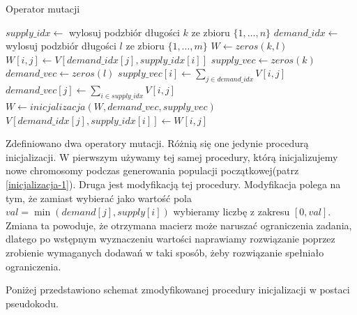 \begin{pseudokod}[H]
    \label{mutacja}
    \caption{Operator mutacji}
    \BlankLine
    $supply\_idx \gets$ wylosuj podzbiór długości $k$ ze zbioru $\{1, \dots, n\}$\;
    $demand\_idx \gets$ wylosuj podzbiór długości $l$ ze zbioru $\{1, \dots, m\}$\;
    $W \gets zeros(k, l)$
    \BlankLine
     {
         {
            $W[i, j] \gets V[demand\_idx[j], supply\_idx[i]]$\;
        }
    }
    \BlankLine
    $supply\_vec \gets zeros(k)$
    $demand\_vec \gets zeros(l)$
    \BlankLine
     {
        $supply\_vec[i] \gets \sum_{j \in demand\_idx} V[i, j]$\;
    }
    \BlankLine
     {
        $demand\_vec[j] \gets \sum_{i \in supply\_idx} V[i, j]$\;
    }
    \BlankLine
    $W \gets inicjalizacja(W, demand\_vec, supply\_vec)$\;
    \BlankLine
     {
         {
            $V[demand\_idx[j], supply\_idx[i]] \gets W[i, j]$\;
        }
    }
    
\end{pseudokod}

Zdefiniowano dwa operatory mutacji. Różnią się one jedynie procedurą inicjalizacji. W pierwszym używamy tej samej procedury, którą inicjalizujemy 
nowe chromosomy podczas generowania populacji początkowej(patrz \ref{inicjalizacja-1}). Druga jest modyfikacją tej procedury. Modyfikacja polega na tym, że zamiast wybierać 
jako wartość pola $val = \min(demand[j], supply[i])$ wybieramy liczbę z zakresu $[0, val]$. Zmiana ta powoduje, że otrzymana macierz może naruszać 
ograniczenia zadania, dlatego po wstępnym wyznaczeniu wartości naprawiamy rozwiązanie poprzez zrobienie wymaganych dodawań w taki sposób, żeby 
rozwiązanie spełniało ograniczenia.

Poniżej przedstawiono schemat zmodyfikowanej procedury inicjalizacji w postaci pseudokodu.

